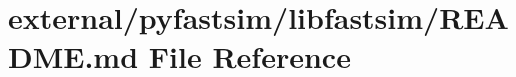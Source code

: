 \hypertarget{external_2pyfastsim_2libfastsim_2_r_e_a_d_m_e_8md}{}\section{external/pyfastsim/libfastsim/\+R\+E\+A\+D\+ME.md File Reference}
\label{external_2pyfastsim_2libfastsim_2_r_e_a_d_m_e_8md}
